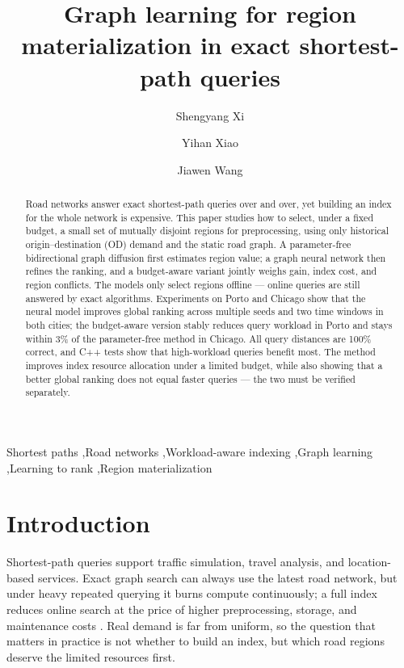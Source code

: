 \documentclass[5p,twocolumn,authoryear]{elsarticle}
\begin{document}
\begin{frontmatter}

\title{Graph learning for region materialization in exact shortest-path queries}

\author{Shengyang Xi}
\author{Yihan Xiao}
\author{Jiawen Wang}

\begin{abstract}
Road networks answer exact shortest-path queries over and over, yet building an index
for the whole network is expensive. This paper studies how to select, under a fixed
budget, a small set of mutually disjoint regions for preprocessing, using only
historical origin--destination (OD) demand and the static road graph. A parameter-free
bidirectional graph diffusion first estimates region value; a graph neural network then
refines the ranking, and a budget-aware variant jointly weighs gain, index cost, and
region conflicts. The models only select regions offline --- online queries are still
answered by exact algorithms. Experiments on Porto and Chicago show that the neural
model improves global ranking across multiple seeds and two time windows in both
cities; the budget-aware version stably reduces query workload in Porto and stays
within 3\% of the parameter-free method in Chicago. All query distances are 100\%
correct, and C++ tests show that high-workload queries benefit most. The method
improves index resource allocation under a limited budget, while also showing that a
better global ranking does not equal faster queries --- the two must be verified
separately.
\end{abstract}

\begin{keyword}
Shortest paths \sep Road networks \sep Workload-aware indexing \sep Graph learning
\sep Learning to rank \sep Region materialization
\end{keyword}

\end{frontmatter}

\section{Introduction}

Shortest-path queries support traffic simulation, travel analysis, and location-based
services. Exact graph search can always use the latest road network, but under heavy
repeated querying it burns compute continuously; a full index reduces online search at
the price of higher preprocessing, storage, and maintenance costs
\citep{dijkstra1959,salt2014}. Real demand is far from uniform, so the question that
matters in practice is not whether to build an index, but which road regions deserve
the limited resources first.
\end{document}
